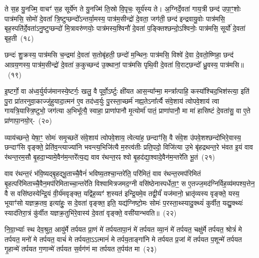 ते स॒ह यु॒नज्मि॒ वाचꣳ॑ स॒ह सूर्ये॑ण ते यु॒नज्मि॑ ति॒स्रो वि॒पृचः॒ सूर्य॑स्य ते। अ॒ग्निर्दे॒वता॑ गाय॒त्री छन्द॑ उपा॒ꣳ॒शोः पात्र॑मसि॒ सोमो॑ दे॒वता᳚ त्रि॒ष्टुप्छन्दो᳚\-ऽन्तर्या॒मस्य॒ पात्र॑म॒सीन्द्रो॑ दे॒वता॒ जग॑ती॒ छन्द॑ इन्द्रवायु॒वोः पात्र॑मसि॒ बृह॒स्पति॑र्दे॒वता॑\-ऽनु॒ष्टुप्छन्दो॑ मि॒त्रावरु॑णयोः॒ पात्र॑मस्य॒श्विनौ॑ दे॒वता॑ प॒ङ्क्तिश्छन्दो॒\-ऽश्विनोः॒ पात्र॑मसि॒ सूर्यो॑ दे॒वता॑ बृह॒ती~(१८)

छन्दः॑ शु॒क्रस्य॒ पात्र॑मसि च॒न्द्रमा॑ दे॒वता॑ स॒तोबृ॑हती॒ छन्दो॑ म॒न्थिनः॒ पात्र॑मसि॒ विश्वे॑ दे॒वा दे॒वतो॒ष्णिहा॒ छन्द॑ आग्रय॒णस्य॒ पात्र॑म॒सीन्द्रो॑ दे॒वता॑ क॒कुच्छन्द॑ उ॒क्थानां॒ पात्र॑मसि पृथि॒वी दे॒वता॑ वि॒राट्छन्दो᳚ ध्रु॒वस्य॒ पात्र॑मसि॥~(१९)

{\anuvakamend[{अ॒न्तरि॑क्षेण बृह॒ती त्रय॑स्त्रिꣳशच्च}]}%

इ॒ष्टर्गो॒ वा अ॑ध्व॒र्युर्यज॑मानस्ये॒ष्टर्गः॒ खलु॒ वै पूर्वो॒\-ऽर्ष्टुः क्षी॑यत आस॒न्या᳚न्मा॒ मन्त्रा᳚त्पाहि॒ कस्या᳚श्चिद॒भिश॑स्त्या॒ इति॑ पु॒रा प्रा॑तरनुवा॒काज्जु॑हुयादा॒त्मन॑ ए॒व तद॑ध्व॒र्युः पु॒रस्ता॒च्छर्म॑ नह्य॒ते\-ऽना᳚र्त्यै संवे॒शाय॑ त्वोपवे॒शाय॑ त्वा गायत्रि॒यास्त्रि॒ष्टुभो॒ जग॑त्या अ॒भिभू᳚त्यै॒ स्वाहा॒ प्राणा॑पानौ मृ॒त्योर्मा॑ पातं॒ प्राणा॑पानौ॒ मा मा॑ हासिष्टं दे॒वता॑सु॒ वा ए॒ते प्रा॑णापा॒नयो॒र्-~(२०)

व्याय॑च्छन्ते॒ येषा॒ꣳ॒ सोमः॑ समृ॒च्छते॑ संवे॒शाय॑ त्वोपवे॒शाय॒ त्वेत्या॑ह॒ छन्दाꣳ॑सि॒ वै सं॑वे॒श उ॑पवे॒शश्छन्दो॑भिरे॒वास्य॒ छन्दाꣳ॑सि वृङ्क्ते॒ प्रेति॑व॒न्त्याज्या॑नि भवन्त्य॒भिजि॑त्यै म॒रुत्व॑तीः प्रति॒पदो॒ विजि॑त्या उ॒भे बृ॑हद्रथन्त॒रे भ॑वत इ॒यं वाव र॑थन्त॒रम॒सौ बृ॒हदा॒भ्यामे॒वैन॑म॒न्तरे᳚त्य॒द्य वाव र॑थन्त॒रꣴ श्वो बृ॒हद॑द्या॒श्वादे॒वैन॑म॒न्तरे॑ति भू॒तं~(२१)

वाव र॑थन्त॒रं भ॑वि॒ष्यद्बृ॒हद्भू॒ताच्चै॒वैनं॑ भविष्य॒तश्चा॒न्तरे॑ति॒ परि॑मितं॒ वाव र॑थन्त॒रमप॑रिमितं बृ॒हत्परि॑मिताच्चै॒वैन॒मप॑रि\-मिताच्चा॒न्तरे॑ति विश्वामित्रजमद॒ग्नी वसि॑ष्ठेनास्पर्धेता॒ꣳ॒ स ए॒तज्ज॒मद॑ग्निर्विह॒व्य॑मपश्य॒त्तेन॒ वै स वसि॑ष्ठस्येन्द्रि॒यं वी॒र्य॑मवृङ्क्त॒ यद्वि॑ह॒व्यꣳ॑ श॒स्यत॑ इन्द्रि॒यमे॒व तद्वी॒र्यं॑ यज॑मानो॒ भ्रातृ॑व्यस्य वृङ्क्ते॒ यस्य॒ भूयाꣳ॑सो यज्ञक्र॒तव॒ इत्या॑हुः॒ स दे॒वता॑ वृङ्क्त॒ इति॒ यद्य॑ग्निष्टो॒मः सोमः॑ प॒रस्ता॒थ्स्यादु॒क्थ्यं॑ कुर्वीत॒ यद्यु॒क्थ्यः॑ स्याद॑तिरा॒त्रं कु॑र्वीत यज्ञक्र॒तुभि॑रे॒वास्य॑ दे॒वता॑ वृङ्क्ते॒ वसी॑यान्भवति॥~(२२)

{\anuvakamend[{प्रा॒णा॒पा॒नयो᳚र्भू॒तं वृ॑ङ्क्ते॒\-ऽष्टाविꣳ॑शतिश्च}]}%

नि॒ग्रा॒भ्याः᳚ स्थ देव॒श्रुत॒ आयु॑र्मे तर्पयत प्रा॒णं मे॑ तर्पयतापा॒नं मे॑ तर्पयत व्या॒नं मे॑ तर्पयत॒ चक्षु॑र्मे तर्पयत॒ श्रोत्रं॑ मे तर्पयत॒ मनो॑ मे तर्पयत॒ वाचं॑ मे तर्पयता॒ऽऽत्मानं॑ मे तर्पय॒ताङ्गा॑नि मे तर्पयत प्र॒जां मे॑ तर्पयत प॒शून्मे॑ तर्पयत गृ॒हान्मे॑ तर्पयत ग॒णान्मे॑ तर्पयत स॒र्वग॑णं मा तर्पयत त॒र्पय॑त मा~(२३)

